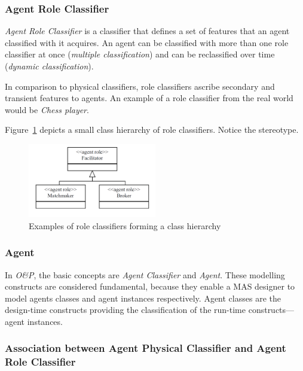 \subsubsection*{Agent Role Classifier}

\textit{Agent Role Classifier} is a classifier that defines a set of features that an agent classified with it acquires.
An agent can be classified with more than one role classifier at once (\textit{multiple classification}) and can be reclassified over time (\textit{dynamic classification}).

In comparison to physical classifiers, role classifiers ascribe secondary and transient features to agents.
An example of a role classifier from the real world would be \textit{Chess player}.

Figure~\ref{figure:onp-role-classifier-examples} depicts a small class hierarchy of role classifiers.
Notice the  stereotype.

\begin{figure}[ht]
	\centering
	\includegraphics[width=0.5\textwidth]{images/onp/role-classifier-examples.png}
	\caption{Examples of role classifiers forming a class hierarchy \cite{Odell05}}
	\label{figure:onp-role-classifier-examples}
\end{figure}

\subsubsection*{Agent}

In \textit{O\&P}, the basic concepts are \textit{Agent Classifier} and \textit{Agent}.
These modelling constructs are considered fundamental, because they enable a MAS designer to model agents classes and agent instances respectively.
Agent classes are the design-time constructs providing the classification of the run-time constructs---agent instances.

\subsubsection*{Association between Agent Physical Classifier and Agent Role Classifier}

